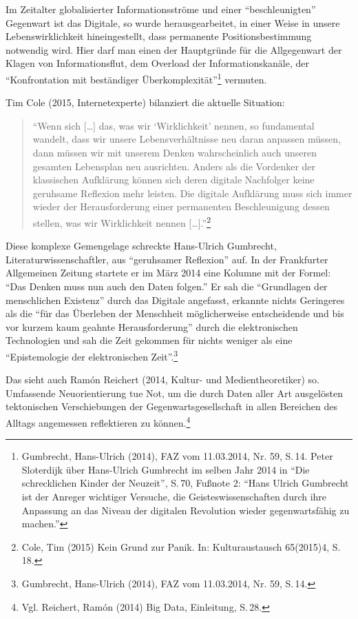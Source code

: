 \documentclass[a4paper,
fontsize=11pt,
oneside,
numbers=noperiodatend,
parskip=half-,
bibliography=totoc,
final
]{scrartcl}
\begin{document}
Im Zeitalter globalisierter Informationsströme und einer
\enquote{beschleunigten} Gegenwart ist das Digitale, so wurde
herausgearbeitet, in einer Weise in unsere Lebenswirklichkeit
hineingestellt, dass permanente Positionsbestimmung notwendig wird. Hier
darf man einen der Hauptgründe für die Allgegenwart der Klagen von
Informationsflut, dem Overload der Informationskanäle, der
\enquote{Konfrontation mit beständiger Überkomplexität}\footnote{Gumbrecht,
  Hans-Ulrich (2014), FAZ vom 11.03.2014, Nr. 59, S.\,14. Peter
  Sloterdijk über Hans-Ulrich Gumbrecht im selben Jahr 2014 in
  \enquote{Die schrecklichen Kinder der Neuzeit}, S.\,70, Fußnote 2:
  \enquote{Hans Ulrich Gumbrecht ist der Anreger wichtiger Versuche, die
  Geisteswissenschaften durch ihre Anpassung an das Niveau der digitalen
  Revolution wieder gegenwartsfähig zu machen.}} vermuten.

Tim Cole (2015, Internetexperte) bilanziert die aktuelle Situation:

\begin{quote}
\enquote{Wenn sich {[}\ldots{}{]} das, was wir \enquote{Wirklichkeit}
nennen, so fundamental wandelt, dass wir unsere Lebensverhältnisse neu
daran anpassen müssen, dann müssen wir mit unserem Denken wahrscheinlich
auch unseren gesamten Lebensplan neu ausrichten. Anders als die
Vordenker der klassischen Aufklärung können sich deren digitale
Nachfolger keine geruhsame Reflexion mehr leisten. Die digitale
Aufklärung muss sich immer wieder der Herausforderung einer permanenten
Beschleunigung dessen stellen, was wir Wirklichkeit nennen
{[}\ldots{}{]}.}\footnote{Cole, Tim (2015) Kein Grund zur Panik. In:
  Kulturaustausch 65(2015)4, S.\,18.}
\end{quote}

Diese komplexe Gemengelage schreckte Hans-Ulrich Gumbrecht,
Literaturwissenschaftler, aus \enquote{geruhsamer Reflexion} auf. In der
Frankfurter Allgemeinen Zeitung startete er im März 2014 eine Kolumne
mit der Formel: \enquote{Das Denken muss nun auch den Daten folgen.} Er
sah die \enquote{Grundlagen der menschlichen Existenz} durch das
Digitale angefasst, erkannte nichts Geringeres als die \enquote{für das
Überleben der Menschheit möglicherweise entscheidende und bis vor kurzem
kaum geahnte Herausforderung} durch die elektronischen Technologien und
sah die Zeit gekommen für nichts weniger als eine \enquote{Epistemologie
der elektronischen Zeit}.\footnote{Gumbrecht, Hans-Ulrich (2014), FAZ
  vom 11.03.2014, Nr. 59, S.\,14.}

Das sieht auch Ramón Reichert (2014, Kultur- und Medientheoretiker) so.
Umfassende Neuorientierung tue Not, um die durch Daten aller Art
ausgelösten tektonischen Verschiebungen der Gegenwartsgesellschaft in
allen Bereichen des Alltags angemessen reflektieren zu können.\footnote{Vgl.
  Reichert, Ramón (2014) Big Data, Einleitung, S.\,28.}
\end{document}

